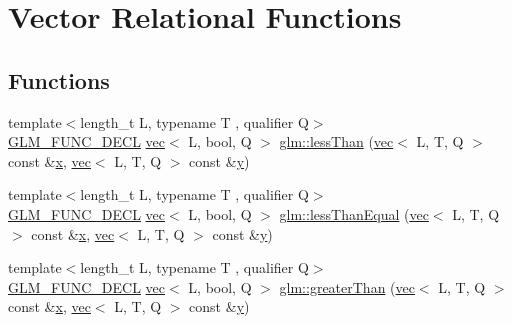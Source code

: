\hypertarget{group__core__func__vector__relational}{}\section{Vector Relational Functions}
\label{group__core__func__vector__relational}
\subsection*{Functions}
\begin{DoxyCompactItemize}
\item 
{\footnotesize template$<$length\+\_\+t L, typename T , qualifier Q$>$ }\\\mbox{\hyperlink{setup_8hpp_ab2d052de21a70539923e9bcbf6e83a51}{G\+L\+M\+\_\+\+F\+U\+N\+C\+\_\+\+D\+E\+CL}} \mbox{\hyperlink{structglm_1_1vec}{vec}}$<$ L, bool, Q $>$ \mbox{\hyperlink{group__core__func__vector__relational_ga314be073c42278ccb6fe7a7958213824}{glm\+::less\+Than}} (\mbox{\hyperlink{structglm_1_1vec}{vec}}$<$ L, T, Q $>$ const \&\mbox{\hyperlink{_s_d_l__opengl_8h_ad0e63d0edcdbd3d79554076bf309fd47}{x}}, \mbox{\hyperlink{structglm_1_1vec}{vec}}$<$ L, T, Q $>$ const \&\mbox{\hyperlink{_s_d_l__opengl_8h_a1675d9d7bb68e1657ff028643b4037e3}{y}})
\item 
{\footnotesize template$<$length\+\_\+t L, typename T , qualifier Q$>$ }\\\mbox{\hyperlink{setup_8hpp_ab2d052de21a70539923e9bcbf6e83a51}{G\+L\+M\+\_\+\+F\+U\+N\+C\+\_\+\+D\+E\+CL}} \mbox{\hyperlink{structglm_1_1vec}{vec}}$<$ L, bool, Q $>$ \mbox{\hyperlink{group__core__func__vector__relational_ga51bf75522dbe1fa5e7806eb9b825ab6a}{glm\+::less\+Than\+Equal}} (\mbox{\hyperlink{structglm_1_1vec}{vec}}$<$ L, T, Q $>$ const \&\mbox{\hyperlink{_s_d_l__opengl_8h_ad0e63d0edcdbd3d79554076bf309fd47}{x}}, \mbox{\hyperlink{structglm_1_1vec}{vec}}$<$ L, T, Q $>$ const \&\mbox{\hyperlink{_s_d_l__opengl_8h_a1675d9d7bb68e1657ff028643b4037e3}{y}})
\item 
{\footnotesize template$<$length\+\_\+t L, typename T , qualifier Q$>$ }\\\mbox{\hyperlink{setup_8hpp_ab2d052de21a70539923e9bcbf6e83a51}{G\+L\+M\+\_\+\+F\+U\+N\+C\+\_\+\+D\+E\+CL}} \mbox{\hyperlink{structglm_1_1vec}{vec}}$<$ L, bool, Q $>$ \mbox{\hyperlink{group__core__func__vector__relational_gad3a3a7d228da3754c328c9a778f6df56}{glm\+::greater\+Than}} (\mbox{\hyperlink{structglm_1_1vec}{vec}}$<$ L, T, Q $>$ const \&\mbox{\hyperlink{_s_d_l__opengl_8h_ad0e63d0edcdbd3d79554076bf309fd47}{x}}, \mbox{\hyperlink{structglm_1_1vec}{vec}}$<$ L, T, Q $>$ const \&\mbox{\hyperlink{_s_d_l__opengl_8h_a1675d9d7bb68e1657ff028643b4037e3}{y}})

\end{DoxyCompactItemize}
